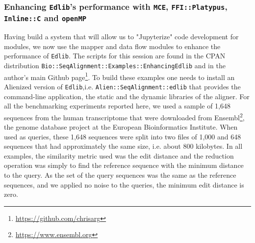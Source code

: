 \documentclass[10pt]{article}
\begin{document}
\subsubsection{Enhancing \texttt{Edlib}'s performance with \texttt{MCE}, \texttt{FFI::Platypus}, \texttt{Inline::C} and \texttt{openMP}}
Having build a system that will allow us to "Jupyterize" code development for modules, we now use the mapper and data flow modules to enhance the performance of \texttt{Edlib}. The scripts for this session are found in the CPAN distribution \texttt{Bio::SeqAlignment::Examples::EnhancingEdlib} and in the author's main Github page\footnote{\url{https://github.com/chrisarg}}. To build these examples one needs to install an Alienized version of \texttt{Edlib},i.e. \texttt{Alien::SeqAlignment::edlib} that provides the command-line application, the static and the dynamic libraries of the aligner. For all the benchmarking experiments reported here, we used a sample of 1,648 sequences from the human transcriptome that were downloaded from Ensembl\footnote{\url{https://www.ensembl.org}}, the genome database project at the European Bioinformatics Institute. When used as queries, these 1,648 sequences were split into two files of 1,000 and 648 sequences that had approximately the same size, i.e. about 800 kilobytes. In all examples, the similarity metric used was the edit distance and the reduction operation was simply to find the reference sequence with the minimum distance to the query. As the set of the query sequences was the same as the reference sequences, and we applied no noise to the queries, the minimum edit distance is zero. 
\end{document}

